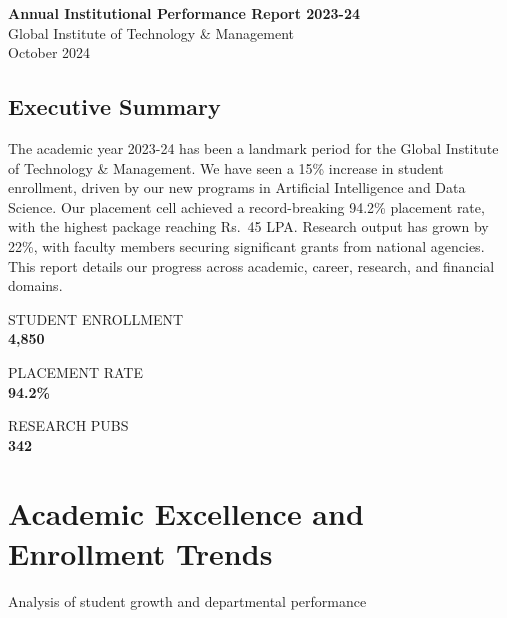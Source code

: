 \documentclass[11pt,a4paper]{article}
\newcommand{\InstituteName}{Global Institute of Technology \& Management}
\newcommand{\ReportTitle}{Annual Institutional Performance Report 2023-24}
\newcommand{\ReportDate}{October 2024}
\newcommand{\rupee}{Rs.~}
\newcommand{\kpi}[2]{
    \begin{tcolorbox}[colback=gray!5, colframe=gray!10, arc=5pt, boxrule=0.5pt, halign=center]
        {\footnotesize\uppercase{\textcolor{muted}{#1}}}\\[0.1cm]
        {\Large\textbf{\textcolor{primary}{#2}}}
    \end{tcolorbox}
}
\newenvironment{card}{
    \begin{tcolorbox}[colback=white, colframe=gray!20, arc=5pt, boxrule=0.5pt, left=15pt, right=15pt, top=15pt, bottom=15pt]
}{
    \end{tcolorbox}
}
\begin{document}
\thispagestyle{empty}
\begin{center}
    \vspace*{2cm}
    
    \vspace{1.5cm}
    {\Huge\textcolor{primary}{\textbf{\ReportTitle}}}\\[0.5cm]
    {\Large\textcolor{muted}{\InstituteName}}\\[0.2cm]
    {\large \ReportDate}
    
    \vspace{2cm}
    
    \begin{card}
        \section*{Executive Summary}
        The academic year 2023-24 has been a landmark period for the \InstituteName. We have seen a 15\% increase in student enrollment, driven by our new programs in Artificial Intelligence and Data Science. Our placement cell achieved a record-breaking 94.2\% placement rate, with the highest package reaching \rupee 45 LPA. Research output has grown by 22\%, with faculty members securing significant grants from national agencies. This report details our progress across academic, career, research, and financial domains.
    \end{card}
    
    \vspace{1cm}
    
    \begin{minipage}[t]{0.31\textwidth}
        \kpi{Student Enrollment}{4,850}
    \end{minipage}%
    \hfill
    \begin{minipage}[t]{0.31\textwidth}
        \kpi{Placement Rate}{94.2\%}
    \end{minipage}%
    \hfill
    \begin{minipage}[t]{0.31\textwidth}
        \kpi{Research Pubs}{342}
    \end{minipage}
\end{center}
\clearpage

\section*{Academic Excellence and Enrollment Trends}
{\large\textcolor{muted}{Analysis of student growth and departmental performance}}
\end{document}
